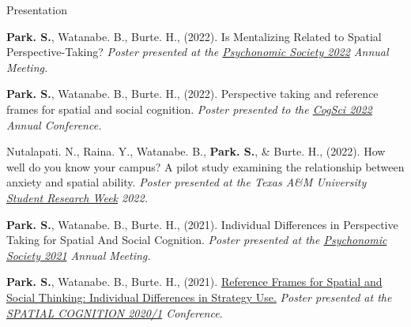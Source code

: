 \documentclass{resume} %
\begin{document}
\begin{rSection}{Presentation}
	\setlength{\hangingindent}{1.27cm}
    
    \begin{hangingpar}
        
        \textbf{Park. S.}, Watanabe. B., Burte. H., (2022). 
        Is Mentalizing Related to Spatial Perspective-Taking? 
        \em{Poster presented at the
            \href{https://www.psychonomic.org/page/2022annualmeeting}{Psychonomic
                Society 2022} Annual Meeting.}
        
    \end{hangingpar}

    \begin{hangingpar}
        
        \textbf{Park. S.}, Watanabe. B., Burte. H., (2022). 
        Perspective taking and reference frames for spatial and social 
        cognition. 
        \em{Poster presented to the
            \href{https://cognitivesciencesociety.org/cogsci-2022/}{CogSci 
            2022} Annual Conference.}
        
    \end{hangingpar}

    \begin{hangingpar}
        
        Nutalapati. N., Raina. Y., Watanabe. B., \textbf{Park. S.}, \& Burte. 
        H., (2022). 
        How well do you know your campus? A pilot study examining the 
        relationship between anxiety and spatial ability. 
        \em{Poster presented at the Texas A\&M University
            \href{https://srw.tamu.edu/}{Student Research Week} 2022.}
        
    \end{hangingpar}
	
	\begin{hangingpar}
		
		\textbf{Park. S.}, Watanabe. B., Burte. H., (2021). 
		Individual Differences in Perspective Taking for Spatial And Social Cognition. 
		\em{Poster presented at the
			\href{https://www.psychonomic.org/page/2021annualmeeting}{Psychonomic Society 2021} Annual Meeting.}
		
	\end{hangingpar}
	
	\begin{hangingpar}
		
		\textbf{Park. S.}, Watanabe. B., Burte. H., (2021). 
		\href{https://sc2020.lu.lv/wp-content/uploads/2021/08/spatialCog21Poster_SungjoonParkV2.pdf}{Reference Frames for Spatial and Social Thinking: 
		Individual Differences in Strategy Use.} 
		\em{Poster presented at the 
			\href{http://sc2020.lu.lv/}{SPATIAL COGNITION 2020/1} Conference.}
		

\end{hangingpar}
\end{rSection}
\end{document}
